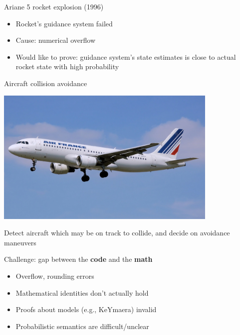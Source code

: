 \documentclass[14pt, notes]{beamer}
\begin{document}
\begin{frame}{Ariane 5 rocket explosion (1996)}

\begin{itemize}
\item Rocket's guidance system failed
\bigskip
\item Cause: numerical overflow
\bigskip
\item Would like to prove: guidance system's state estimates is close to actual rocket state with high probability
\end{itemize}
\end{frame}

\begin{frame}{Aircraft collision avoidance}
\begin{center}
\includegraphics[width=0.8\textwidth]{images/airplane.jpg}
\end{center}

Detect aircraft which may be on track to collide, and decide on avoidance maneuvers
\end{frame}

\begin{frame}
\begin{center}
\huge Challenge: gap between the \textbf{code} and the \textbf{math}
\end{center}

\bigskip
\pause 
\begin{itemize}
  \item Overflow, rounding errors
  \item Mathematical identities don't actually hold
  \item Proofs about models (e.g., KeYmaera) invalid
  \item Probabilistic semantics are difficult/unclear
\end{itemize}
\end{frame}
\end{document}

